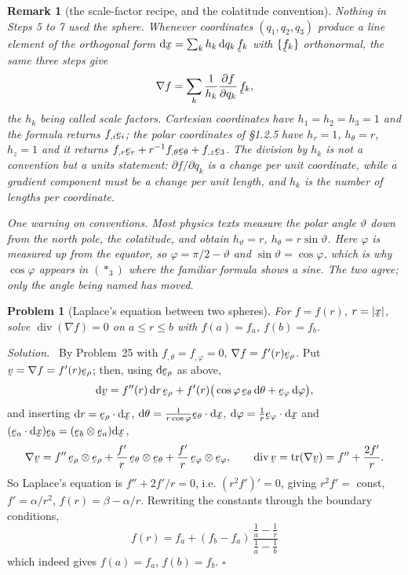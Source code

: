 \documentclass[17pt,a4paper]{extreport}
\DeclareRobustCommand{\vek}[1]{\underaccent{\tilde}{#1}}
\newcommand{\tr}{\operatorname{tr}}
\newcommand{\grad}{\nabla}
\newcommand{\dvg}{\operatorname{div}}
\newcommand{\bv}{\vek{v}}
\newcommand{\bx}{\vek{x}}
\newcommand{\be}{\vek{e}}
\newcommand{\bff}{\vek{f}}
\newcommand{\ber}{\vek{e}_{r}}
\renewcommand{\beth}{\vek{e}_{\theta}}
\newcommand{\beph}{\vek{e}_{\varphi}}
\newcommand{\berho}{\vek{e}_{\rho}}
\newcommand{\dl}{\mathrm{d}}
\theoremstyle{scplain}
\theoremstyle{scdefn}
\newtheorem{remark}[theorem]{Remark}
\theoremstyle{scplain}
\newtheorem{problem}{Problem}
\newenvironment{solution}
 {\par\smallskip\noindent\textit{Solution.}\ }
 {\hfill$\square$\par\medskip}
\begin{document}
\begin{remark}[the scale-factor recipe, and the colatitude convention]%
\label{rem:lame}
Nothing in Steps 5 to 7 used the sphere. Whenever coordinates
$(q_{1},q_{2},q_{3})$ produce a line element of the orthogonal form
$\dl\bx=\sum_{k}h_{k}\,\dl q_{k}\,\bff_{k}$ with $\{\bff_{k}\}$ orthonormal,
the same three steps give
\[
   \grad f=\sum_{k}\frac{1}{h_{k}}\frac{\partial f}{\partial q_{k}}\,\bff_{k},
\]
the $h_{k}$ being called scale factors. Cartesian coordinates have
$h_{1}=h_{2}=h_{3}=1$ and the formula returns $f_{,i}\be_{i}$; the polar
coordinates of \S1.2.5 have $h_{r}=1$, $h_{\theta}=r$, $h_{z}=1$ and it
returns $f_{,r}\ber+r^{-1}f_{,\theta}\beth+f_{,z}\be_{3}$. The division by
$h_{k}$ is not a convention but a units statement: $\partial f/\partial
q_{k}$ is a change per unit \emph{coordinate}, while a gradient component
must be a change per unit \emph{length}, and $h_{k}$ is the number of
lengths per coordinate.

One warning on conventions. Most physics texts measure the polar angle
$\vartheta$ down from the north pole, the colatitude, and obtain
$h_{\vartheta}=r$, $h_{\theta}=r\sin\vartheta$. Here $\varphi$ is measured
up from the equator, so $\varphi=\pi/2-\vartheta$ and
$\sin\vartheta=\cos\varphi$, which is why $\cos\varphi$ appears in
$(\ast_3)$ where the familiar formula shows a sine. The two agree; only the
angle being named has moved.
\end{remark}

\begin{problem}[Laplace's equation between two spheres]
For $f=f(r)$, $r=|\bx|$, solve $\dvg(\grad f)=0$ on $a\le r\le b$ with
$f(a)=f_a$, $f(b)=f_b$.
\end{problem}
\begin{solution}
By Problem~25 with $f_{,\theta}=f_{,\varphi}=0$, $\grad f=f'(r)\berho$. Put
$\bv=\grad f=f'(r)\berho$; then, using $\dl\berho$ as above,
\[
\dl\bv=f''(r)\,\dl r\,\berho+f'(r)\big(\cos\varphi\,\beth\,\dl\theta
+\beph\,\dl\varphi\big),
\]
and inserting $\dl r=\berho\cdot\dl\bx$,
$\dl\theta=\tfrac{1}{r\cos\varphi}\beth\cdot\dl\bx$,
$\dl\varphi=\tfrac1r\beph\cdot\dl\bx$ and
$(\be_a\cdot\dl\bx)\be_b=(\be_b\otimes\be_a)\dl\bx$,
\[
\grad\bv=f''\,\berho\otimes\berho+\frac{f'}{r}\,\beth\otimes\beth
+\frac{f'}{r}\,\beph\otimes\beph,\qquad
\dvg\bv=\tr(\grad\bv)=f''+\frac{2f'}{r}.
\]
So Laplace's equation is $f''+2f'/r=0$, i.e. $(r^2f')'=0$, giving
$r^2f'=$ const, $f'=\alpha/r^2$, $f(r)=\beta-\alpha/r$. Rewriting the
constants through the boundary conditions,
\[
\boxed{\,f(r)=f_a+(f_b-f_a)\,\frac{\tfrac1a-\tfrac1r}{\tfrac1a-\tfrac1b}\,}
\]
which indeed gives $f(a)=f_a$, $f(b)=f_b$.
\end{solution}
\end{document}
